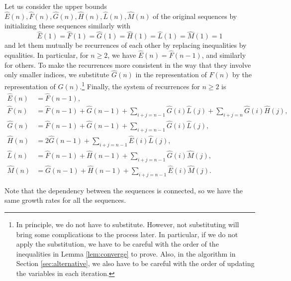 \documentclass[a4paper,12pt]{article}
\begin{document}
Let us consider the upper bounds $\hat{E}(n), \hat{F}(n), \hat{G}(n), \hat{H}(n), \hat{L}(n), \hat{M}(n)$ of the original sequences by initializing these sequences similarly with 
\[
    \hat{E}(1)=\hat{F}(1)=\hat{G}(1)=\hat{H}(1)=\hat{L}(1)=\hat{M}(1)=1
\]
and let them mutually be recurrences of each other by replacing inequalities by equalities. In particular, for $n\ge 2$, we have
$\hat{E}(n) = \hat{F}(n-1)$, and similarly for others. To make the recurrences more consistent in the way that they involve only smaller indices, we substitute  $\hat{G}(n)$ in the representation of $\hat{F}(n)$ by the representation of $\hat{G}(n)$.\footnote{In principle, we do not have to substitute. However, not substituting will bring some complications to the process later. In particular, if we do not apply the substitution, we have to be careful with the order of the inequalities in Lemma \ref{lem:converge} to prove. Also, in the algorithm in Section \ref{sec:alternative}, we also have to be careful with the order of updating the variables in each iteration.} Finally, the system of recurrences for $n\ge 2$ is
\begin{align*} 
\hat{E}(n) &= \hat{F}(n-1), \\ 
\hat{F}(n) &= \hat{F}(n-1)+\hat{G}(n-1)+\sum_{i+j=n-1} \hat{G}(i) \hat{L}(j) + \sum_{i+j=n} \hat{G}(i) \hat{H}(j), \\ 
\hat{G}(n) &= \hat{F}(n-1)+\hat{G}(n-1)+\sum_{i+j=n-1} \hat{G}(i) \hat{L}(j), \\ 
\hat{H}(n) &= 2\hat{G}(n-1)+ \sum_{i+j=n-1} \hat{E}(i) \hat{L}(j), \\ 
\hat{L}(n) &= \hat{F}(n-1)+\hat{H}(n-1)+ \sum_{i+j=n-1} \hat{G}(i) \hat{M}(j), \\ 
\hat{M}(n) &= \hat{G}(n-1)+\hat{H}(n-1)+ \sum_{i+j=n-1} \hat{E}(i) \hat{M}(j). 
\end{align*}

Note that the dependency between the sequences is connected, so we have the same growth rates for all the sequences.
\end{document}
